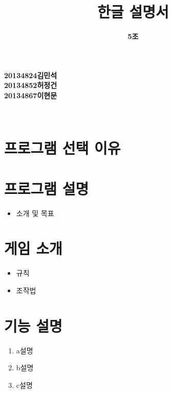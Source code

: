 \documentclass[a4paper, 11pt]{article}
\title{\textbf{\Huge오목 한글 설명서}}
\author{\textbf{\LARGE5조}}
\begin{document}
	
	\maketitle
	
	\vspace{6cm}
	\begin{center}
		\textbf{\large20134824김민석}\\
		\textbf{\large20134852허정건}\\
		\textbf{\large20134867이현문}\\
	\end{center}
	
	
	
	
	\maketitle
	\newpage
	\thispagestyle{empty}        
	\mbox{}
	
	\begin{center} 
		\textbf{}\\
	\end{center}
	\vspace{0.5cm}
	\section{프로그램 선택 이유}
	\vspace{0.5cm}
	\section{프로그램 설명}
	\begin{itemize}
		\item 소개 및 목표
	\end{itemize}
	
	\section{게임 소개}
		\begin{itemize}
		\item 규칙
		\item 조작법
	\end{itemize}

	
	\section{기능 설명}
	\begin{enumerate}
		\item a설명
		\item b설명
		\item c설명
	\end{enumerate}
	
\end{document}
